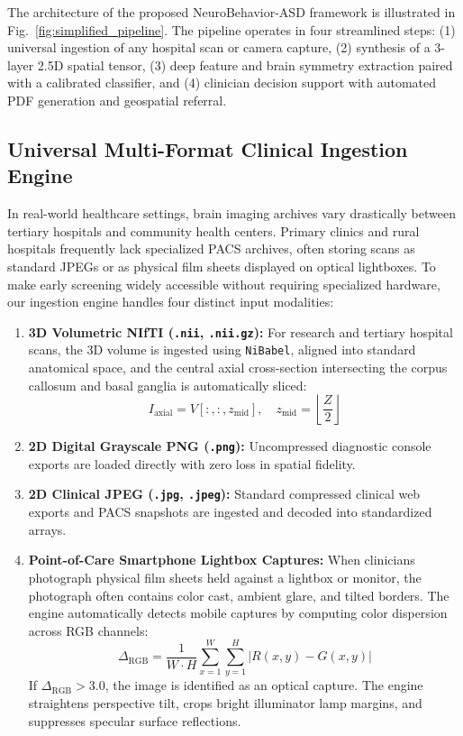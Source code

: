 \documentclass[conference]{IEEEtran}
\begin{document}
The architecture of the proposed NeuroBehavior-ASD framework is illustrated in Fig.~\ref{fig:simplified_pipeline}. The pipeline operates in four streamlined steps: (1) universal ingestion of any hospital scan or camera capture, (2) synthesis of a 3-layer 2.5D spatial tensor, (3) deep feature and brain symmetry extraction paired with a calibrated classifier, and (4) clinician decision support with automated PDF generation and geospatial referral.

\subsection{Universal Multi-Format Clinical Ingestion Engine}
In real-world healthcare settings, brain imaging archives vary drastically between tertiary hospitals and community health centers. Primary clinics and rural hospitals frequently lack specialized PACS archives, often storing scans as standard JPEGs or as physical film sheets displayed on optical lightboxes. To make early screening widely accessible without requiring specialized hardware, our ingestion engine handles four distinct input modalities:
\begin{enumerate}
    \item \textbf{3D Volumetric NIfTI (\texttt{.nii}, \texttt{.nii.gz}):} For research and tertiary hospital scans, the 3D volume is ingested using \texttt{NiBabel}, aligned into standard anatomical space, and the central axial cross-section intersecting the corpus callosum and basal ganglia is automatically sliced:
    \begin{equation}
    I_{\text{axial}} = V[:, :, z_{\text{mid}}], \quad z_{\text{mid}} = \left\lfloor \frac{Z}{2} \right\rfloor
    \end{equation}
    
    \item \textbf{2D Digital Grayscale PNG (\texttt{.png}):} Uncompressed diagnostic console exports are loaded directly with zero loss in spatial fidelity.
    
    \item \textbf{2D Clinical JPEG (\texttt{.jpg}, \texttt{.jpeg}):} Standard compressed clinical web exports and PACS snapshots are ingested and decoded into standardized arrays.
    
    \item \textbf{Point-of-Care Smartphone Lightbox Captures:} When clinicians photograph physical film sheets held against a lightbox or monitor, the photograph often contains color cast, ambient glare, and tilted borders. The engine automatically detects mobile captures by computing color dispersion across RGB channels:
    \begin{equation}
    \Delta_{\text{RGB}} = \frac{1}{W \cdot H} \sum_{x=1}^{W} \sum_{y=1}^{H} |R(x, y) - G(x, y)|
    \end{equation}
    If $\Delta_{\text{RGB}} > 3.0$, the image is identified as an optical capture. The engine straightens perspective tilt, crops bright illuminator lamp margins, and suppresses specular surface reflections.
\end{enumerate}
\end{document}
